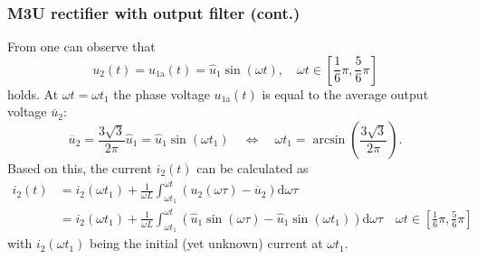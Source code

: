 \begin{frame}
    \frametitle{M3U rectifier with output filter (cont.)}
    From  one can observe that
    \begin{equation}
        u_2(t) = u_{1\mathrm{a}}(t) = \hat{u}_1\sin(\omega t), \quad \omega t \in \left[\frac{1}{6}\pi, \frac{5}{6}\pi\right]
    \end{equation}
    holds. At $\omega t = \omega t_1$ the phase voltage $u_{1\mathrm{a}}(t)$ is equal to the average output voltage $\overline{u}_2$:
    \begin{equation}
            \overline{u}_2 = \frac{3\sqrt{3}}{2\pi}\hat{u}_1 = \hat{u}_1\sin(\omega t_1) \quad \Leftrightarrow \quad \omega t_1 = \arcsin\left(\frac{3\sqrt{3}}{2\pi}\right).
    \end{equation}
    Based on this, the current $i_2(t)$ can be calculated as
    \begin{equation}
        \begin{split}
            i_2(t) &= i_2(\omega t_1) + \frac{1}{\omega L} \int_{\omega t_1}^{\omega t} \left(u_2(\omega \tau) - \overline{u}_2\right) \mathrm{d} \omega \tau  \\  &= i_2(\omega t_1) + \frac{1}{\omega L} \int_{\omega t_1}^{\omega t} \left(\hat{u}_1\sin(\omega \tau) -  \hat{u}_1\sin(\omega t_1)\right) \mathrm{d} \omega \tau \quad \omega t \in \left[\frac{1}{6}\pi, \frac{5}{6}\pi\right]
        \end{split}
        \label{eq:M3U_current_integral_def}
    \end{equation}
    with $i_2(\omega t_1)$ being the initial (yet unknown) current at $\omega t_1$.
\end{frame}

